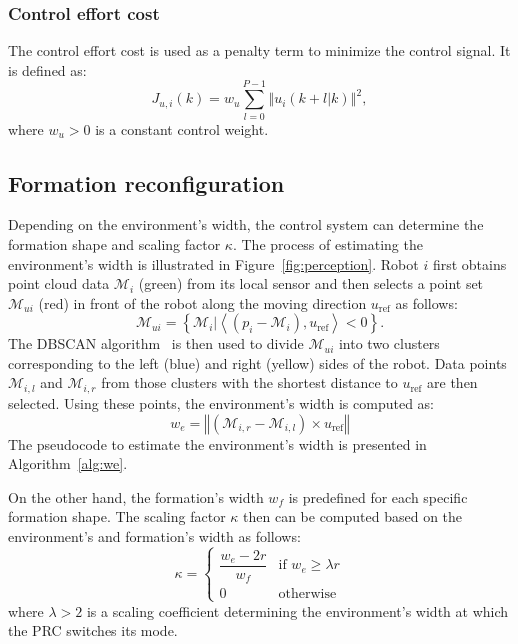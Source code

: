 \subsubsection{Control effort cost}
The control effort cost is used as a penalty term to minimize the control signal. It is defined as:
\begin{equation}
    J_{u,i}(k)=w_u\sum_{l=0}^{P-1}\left\Vert u_i(k+l|k)\right\Vert^2,
\end{equation}
where $w_u>0$ is a constant control weight.

\subsection{Formation reconfiguration}\label{sec:obs_aware}

Depending on the environment's width, the control system can determine the formation shape and scaling factor $\kappa$. The process of estimating the environment's width is illustrated in Figure~\ref{fig:perception}. Robot $i$ first obtains point cloud data $\mathcal{M}_i$ (green) from its local sensor and then selects a point set $\mathcal{M}_{ui}$ (red) in front of the robot along the moving direction $u_\text{ref}$ as follows:
\begin{equation}
    \mathcal{M}_{ui} = \left\{\mathcal{M}_{i}\vert\left\langle\left(p_i-\mathcal{M}_{i}\right),u_\text{ref}\right\rangle<0\right\}.
    \label{eqn:mui}
\end{equation}
The DBSCAN algorithm~\cite{10.5555/3001460.3001507} is then used to divide $\mathcal{M}_{ui}$ into two clusters corresponding to the left (blue) and right (yellow) sides of the robot. Data points $\mathcal{M}_{i,l}$ and $\mathcal{M}_{i,r}$ from those clusters with the shortest distance to $u_\text{ref}$ are then selected. Using these points, the environment's width is computed as:
\begin{equation}
    w_e= \left\Vert\left(\mathcal{M}_{i,r}-\mathcal{M}_{i,l}\right)\times u_\text{ref}\right\Vert
    \label{eqn:we}
\end{equation}
The pseudocode to estimate the environment's width is presented in Algorithm~\ref{alg:we}. 

On the other hand, the formation's width $w_f$ is predefined for each specific formation shape. The scaling factor $\kappa$ then can be computed based on the environment's and formation's width as follows:
\begin{equation}
    \kappa = 
    \begin{cases} 
        \dfrac{w_e - 2r}{w_f} & \text{if } w_e \geq \lambda r \\
        0 & \text{otherwise}
    \end{cases}
    \label{eqn:kappa}
\end{equation}
where $\lambda > 2$ is a scaling coefficient determining the environment's width at which the PRC switches its mode. 

